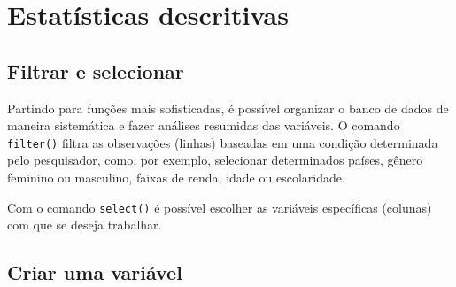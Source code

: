 \documentclass[
  10pt,
  brazil,
  a4paper,
  twoside, notitlepage, openright]{book}
\newenvironment{Shaded}{\begin{snugshade}}{\end{snugshade}}
\newcommand{\CommentTok}[1]{\textcolor[rgb]{0.56,0.35,0.01}{\textit{#1}}}
\newcommand{\DecValTok}[1]{\textcolor[rgb]{0.00,0.00,0.81}{#1}}
\newcommand{\KeywordTok}[1]{\textcolor[rgb]{0.13,0.29,0.53}{\textbf{#1}}}
\newcommand{\NormalTok}[1]{#1}
\newcommand{\OperatorTok}[1]{\textcolor[rgb]{0.81,0.36,0.00}{\textbf{#1}}}
\newcommand{\StringTok}[1]{\textcolor[rgb]{0.31,0.60,0.02}{#1}}
\begin{document}
\hypertarget{estatuxedsticas-descritivas}{%
\section{Estatísticas descritivas}\label{estatuxedsticas-descritivas}}

\hypertarget{filtrar-e-selecionar}{%
\subsection{Filtrar e selecionar}\label{filtrar-e-selecionar}}

Partindo para funções mais sofisticadas, é possível organizar o banco de dados de maneira sistemática e fazer análises resumidas das variáveis. O comando \texttt{filter()} filtra as observações (linhas) baseadas em uma condição determinada pelo pesquisador, como, por exemplo, selecionar determinados países, gênero feminino ou masculino, faixas de renda, idade ou escolaridade.

\begin{Shaded}
\end{Shaded}

Com o comando \texttt{select()} é possível escolher as variáveis específicas (colunas) com que se deseja trabalhar.

\begin{Shaded}
\end{Shaded}

\hypertarget{criar-uma-variuxe1vel}{%
\subsection{Criar uma variável}\label{criar-uma-variuxe1vel}}
\end{document}
